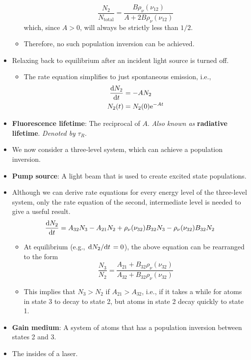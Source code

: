 \documentclass[../notes.tex]{subfiles}
\begin{document}
\begin{itemize}
\begin{itemize}
\begin{equation*}
            \frac{N_2}{N_\text{total}} = \frac{B\rho_\nu(\nu_{12})}{A+2B\rho_\nu(\nu_{12})}
        \end{equation*}
        which, since $A>0$, will always be strictly less than $1/2$.
        \item Therefore, no such population inversion can be achieved.
    \end{itemize}
    \item Relaxing back to equilibrium after an incident light source is turned off.
    \begin{itemize}
        \item The rate equation simplifies to just spontaneous emission, i.e.,
        \begin{align*}
            \dv{N_2}{t} &= -AN_2\\
            N_2(t) &= N_2(0)\e[-At]
        \end{align*}
    \end{itemize}
    \item \textbf{Fluorescence lifetime}: The reciprocal of $A$. \emph{Also known as} \textbf{radiative lifetime}. \emph{Denoted by} $\tau_R$.
    \item {}We now consider a three-level system, which can achieve a population inversion.
    \item \textbf{Pump source}: A light beam that is used to create excited state populations.
    \item Although we can derive rate equations for every energy level of the three-level system, only the rate equation of the second, intermediate level is needed to give a useful result.
    \begin{equation*}
        \dv{N_2}{t} = A_{32}N_3-A_{21}N_2+\rho_\nu(\nu_{32})B_{32}N_3-\rho_\nu(\nu_{32})B_{32}N_2
    \end{equation*}
    \begin{itemize}
        \item At equilibrium (e.g., $\dv*{N_2}{t}=0$), the above equation can be rearranged to the form
        \begin{equation*}
            \frac{N_3}{N_2} = \frac{A_{21}+B_{32}\rho_\nu(\nu_{32})}{A_{32}+B_{32}\rho_\nu(\nu_{32})}
        \end{equation*}
        \item This implies that $N_3>N_2$ if $A_{21}>A_{32}$, i.e., if it takes a while for atoms in state 3 to decay to state 2, but atoms in state 2 decay quickly to state 1.
    \end{itemize}
    \item \textbf{Gain medium}: A system of atoms that has a population inversion between states 2 and 3.
    \item The insides of a laser.
    \begin{figure}[h!]
        \centering
\end{figure}
\end{itemize}
\end{document}
